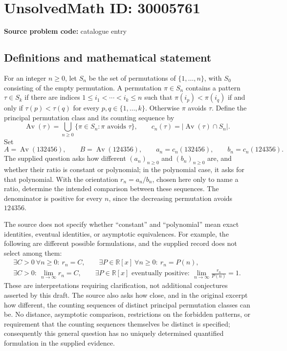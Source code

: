 \documentclass[11pt]{article}
\newcommand{\R}{\mathbb{R}}
\begin{document}
\section*{UnsolvedMath ID: 30005761}
\textbf{Source problem code:} catalogue entry
\subsection{Definitions and mathematical statement}
For an integer \(n\geq 0\), let \(S_n\) be the set of permutations of \(\{1,\ldots,n\}\), with \(S_0\) consisting of the empty permutation. A permutation \(\pi\in S_n\) contains a pattern \(\tau\in S_k\) if there are indices \(1\leq i_1<\cdots<i_k\leq n\) such that \(\pi(i_p)<\pi(i_q)\) if and only if \(\tau(p)<\tau(q)\) for every \(p,q\in\{1,\ldots,k\}\). Otherwise \(\pi\) avoids \(\tau\). Define the principal permutation class and its counting sequence by
\[
\operatorname{Av}(\tau)=\bigcup_{n\geq0}\{\pi\in S_n:\pi\text{ avoids }\tau\},\qquad c_n(\tau)=|\operatorname{Av}(\tau)\cap S_n|.
\]
Set
\[
A=\operatorname{Av}(132456),\qquad B=\operatorname{Av}(124356),\qquad a_n=c_n(132456),\qquad b_n=c_n(124356).
\]
The supplied question asks how different \((a_n)_{n\geq0}\) and \((b_n)_{n\geq0}\) are, and whether their ratio is constant or polynomial; in the polynomial case, it asks for that polynomial. With the orientation \(r_n=a_n/b_n\), chosen here only to name a ratio, determine the intended comparison between these sequences. The denominator is positive for every \(n\), since the decreasing permutation avoids \(124356\).

The source does not specify whether ``constant'' and ``polynomial'' mean exact identities, eventual identities, or asymptotic equivalences. For example, the following are different possible formulations, and the supplied record does not select among them:
\[
\begin{gathered}
\exists C>0\ \forall n\geq0:\ r_n=C,\qquad
\exists P\in\R[x]\ \forall n\geq0:\ r_n=P(n),\\
\exists C>0:\ \lim_{n\to\infty}r_n=C,\qquad
\exists P\in\R[x]\text{ eventually positive}:\ \lim_{n\to\infty}\frac{r_n}{P(n)}=1.
\end{gathered}
\]
These are interpretations requiring clarification, not additional conjectures asserted by this draft. The source also asks how close, and in the original excerpt how different, the counting sequences of distinct principal permutation classes can be. No distance, asymptotic comparison, restrictions on the forbidden patterns, or requirement that the counting sequences themselves be distinct is specified; consequently this general question has no uniquely determined quantified formulation in the supplied evidence.
\end{document}
